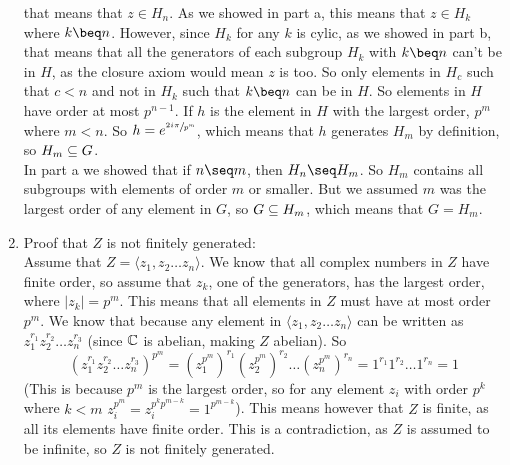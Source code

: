 \documentclass[12pt]{article}
\begin{document}
\begin{enumerate}[label=\textbf{\alph*.}]
            that means that $z \in H_n$.
            As we showed in part a,
            this means that $z \in H_k$ where $k \beq n$.
            However, since $H_k$ for any $k$ is cylic,
            as we showed in part b,
            that means that all the generators of each subgroup $H_k$
            with $k \beq n$
            can't be in $H$,
            as the closure axiom would mean $z$ is too.
            So only elements in $H_c$ such that $c < n$
            and not in $H_k$ such that $k \beq n$ can be in $H$.
            So elements in $H$ have order at most $p^{n-1}$.
            If $h$ is the element in $H$ with the largest order, $p^m$
            where $m < n$.
            So $h = e^{\sfrac{2i\pi}{p^m}}$,
            which means that $h$ generates $H_m$ by definition,
            so $H_m \subseteq G$. \\
            In part a we showed that if $n \seq m$,
            then $H_n \seq H_m$.
            So $H_m$ contains all subgroups with elements 
            of order $m$ or smaller.
            But we assumed $m$ was the largest order of any element in $G$,
            so $G \subseteq H_m$,
            which means that $G = H_m$.
        \item
            Proof that $Z$ is not finitely generated: \\
            Assume that $Z = \langle z_1, z_2 \dots z_n \rangle$.
            We know that all complex numbers in $Z$ have finite order,
            so assume that $z_k$, one of the generators,
            has the largest order, where $|z_k| = p^m$.
            This means that all elements in $Z$
            must have at most order $p^m$.
            We know that because any element
            in $\langle z_1, z_2 \dots z_n \rangle$
            can be written as $z_1^{r_1}z_2^{r_2} \dots z_n^{r_3}$
            (since $\mathbb{C}$ is abelian, making $Z$ abelian).
            So
            \[ (z_1^{r_1}z_2^{r_2} \dots z_n^{r_3})^{p^m}
            = (z_1^{p^m})^{r_1}(z_2^{p^m})^{r_2} \dots (z_n^{p^m})^{r_n}
            = 1^{r_1}1^{r_2} \dots 1^{r_n}
            = 1 \]
            (This is because $p^m$ is the largest order,
            so for any element $z_i$ with order $p^k$ where $k < m$
            $z_i^{p^m} = z_i^{p^kp^{m - k}}  = 1^{p^{m - k}}$).
            This means however that $Z$ is finite,
            as all its elements have finite order.
            This is a contradiction,
            as $Z$ is assumed to be infinite,
            so $Z$ is not finitely generated.
    \end{enumerate}
\end{document}
